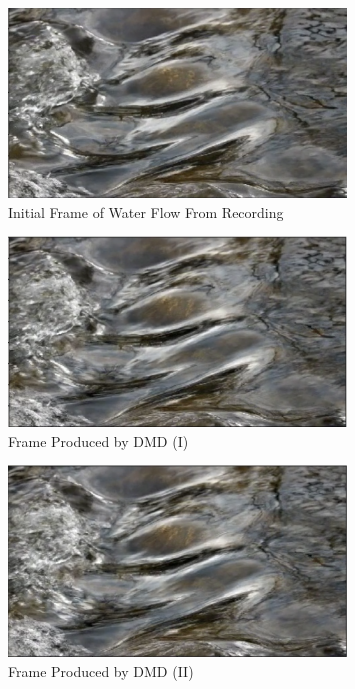 \documentclass[12pt]{report}
\begin{document}
\begin{figure}[H]
    \centering
    \includegraphics[width=0.8\textwidth]{Fluid Dynamics/FD2.png}
    \caption{Initial Frame of Water Flow From Recording} \label{fig:FD2}
\end{figure}
\noindent

\begin{figure}[H]
    \centering
    \includegraphics[width=0.8\textwidth]{Fluid Dynamics/FD3.png}
    \caption{Frame Produced by DMD (I)} \label{fig:FD3}
\end{figure}
\noindent

\begin{figure}[H]
    \centering
    \includegraphics[width=0.8\textwidth]{Fluid Dynamics/FD4.png}
    \caption{Frame Produced by DMD (II)} \label{fig:FD4}
\end{figure}
\noindent
\end{document}
